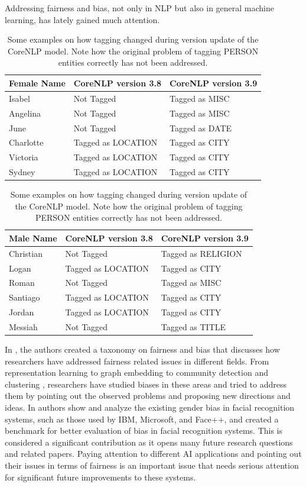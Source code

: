 Addressing fairness and bias, not only in NLP but also in general machine learning, has lately gained much attention. 
\begin{table}
\begin{tabular}{ p{1.2cm} p{3.3cm} p{3.2cm}}
 \toprule
 Female Name&CoreNLP version 3.8&CoreNLP version 3.9\\
 \midrule
 Isabel&Not Tagged&Tagged as MISC\\[0.5pt]
 Angelina&Not Tagged&Tagged as MISC\\[0.5pt]
 June&Not Tagged&Tagged as DATE\\[0.5pt]
 Charlotte&Tagged as LOCATION&Tagged as CITY\\[0.5pt]
 Victoria&Tagged as LOCATION&Tagged as CITY\\[0.5pt]
 Sydney&Tagged as LOCATION&Tagged as CITY\\[0.5pt]
  \bottomrule
\end{tabular}
\newline
\vspace*{0.3 cm}
\newline
\begin{tabular}{ p{1.2cm} p{3.3cm} p{3.2cm}}
 \toprule
 Male Name&CoreNLP version 3.8&CoreNLP version 3.9\\
 \midrule
 Christian&Not Tagged&Tagged as RELIGION\\[0.5pt]
 Logan&Tagged as LOCATION&Tagged as CITY\\[0.5pt]
 Roman&Not Tagged&Tagged as MISC\\[0.5pt]
 Santiago&Tagged as LOCATION&Tagged as CITY\\[0.5pt]
 Jordan&Tagged as LOCATION&Tagged as CITY\\[0.5pt]
 Messiah&Not Tagged&Tagged as TITLE\\[0.5pt]
 \bottomrule
\end{tabular}
\caption{Some examples on how tagging changed during version update of the CoreNLP model. Note how the original problem of tagging PERSON entities correctly has not been addressed.}
    \label{corenlp_version_examples}
\end{table}
In \citet{mehrabi2019survey}, the authors created a taxonomy on fairness and bias that discusses how researchers have addressed fairness related issues in different fields. From representation learning \cite{moyer2018invariant} to graph embedding \cite{bose2019compositional} to community detection \cite{mehrabi2019debiasing} and clustering \cite{pmlr-v97-backurs19a}, researchers have studied biases in these areas and tried to address them by pointing out the observed problems and proposing new directions and ideas. In \citet{buolamwini2018gender} authors show and analyze the existing gender bias in facial recognition systems, such as those used by IBM, Microsoft, and Face++, and created a benchmark for better evaluation of bias in facial recognition systems. This is considered a significant contribution as it opens many future research questions and related papers. Paying attention to different AI applications and pointing out their issues in terms of fairness is an important issue that needs serious attention for significant future improvements to these systems. 




